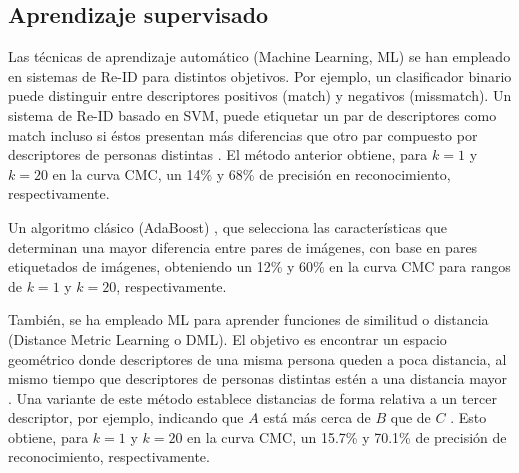 \documentclass[../memoria.tex]{subfiles}
\begin{document}
\subsection{Aprendizaje supervisado}


\indent Las técnicas de aprendizaje automático (Machine Learning, ML) se han empleado en sistemas de Re-ID para distintos objetivos. Por ejemplo, un clasificador binario puede distinguir entre descriptores positivos (match) y negativos (missmatch). Un sistema de Re-ID basado en SVM, puede etiquetar un par de descriptores como match incluso si éstos presentan más diferencias que otro par compuesto por descriptores de personas distintas \cite{prosser2010person}. El método anterior obtiene, para $k=1$ y $k=20$ en la curva CMC, un 14\% y 68\% de precisión en reconocimiento, respectivamente.


\indent Un algoritmo clásico (AdaBoost) \cite{gray2008viewpoint},  que selecciona las características que determinan una mayor diferencia entre pares de imágenes, con base en pares etiquetados de imágenes, obteniendo un 12\% y 60\% en la curva CMC para rangos de $k=1$ y $k=20$, respectivamente. 

\indent También, se ha empleado ML para aprender funciones de similitud o distancia (Distance Metric Learning o DML). El objetivo es encontrar un espacio geométrico donde descriptores de una misma persona queden a poca distancia, al mismo tiempo que descriptores de personas distintas estén a una distancia mayor \cite{bellet2013survey}. Una variante de este método establece distancias de forma relativa a un tercer descriptor, por ejemplo, indicando que $A$ está más cerca de $B$ que de $C$ \cite{zheng2013reidentification}. Esto obtiene, para $k=1$ y $k=20$ en la curva CMC, un 15.7\% y 70.1\% de precisión de reconocimiento, respectivamente.  
\end{document}
